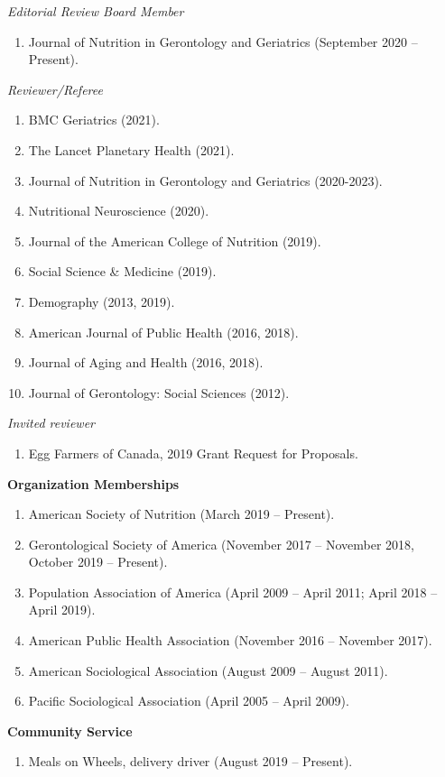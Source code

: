 \documentclass[
]{article}
\providecommand{\tightlist}{%
  \setlength{\itemsep}{0pt}\setlength{\parskip}{0pt}}
\begin{document}
\emph{Editorial Review Board Member}

\begin{enumerate}
\def\labelenumi{\arabic{enumi}.}
\tightlist
\item
  Journal of Nutrition in Gerontology and Geriatrics (September 2020 --
  Present).
\end{enumerate}

\emph{Reviewer/Referee}

\begin{enumerate}
\def\labelenumi{\arabic{enumi}.}
\item
  BMC Geriatrics (2021).
\item
  The Lancet Planetary Health (2021).
\item
  Journal of Nutrition in Gerontology and Geriatrics (2020-2023).
\item
  Nutritional Neuroscience (2020).
\item
  Journal of the American College of Nutrition (2019).
\item
  Social Science \& Medicine (2019).
\item
  Demography (2013, 2019).
\item
  American Journal of Public Health (2016, 2018).
\item
  Journal of Aging and Health (2016, 2018).
\item
  Journal of Gerontology: Social Sciences (2012).
\end{enumerate}

\emph{Invited reviewer}

\begin{enumerate}
\def\labelenumi{\arabic{enumi}.}
\tightlist
\item
  Egg Farmers of Canada, 2019 Grant Request for Proposals.
\end{enumerate}

\textbf{Organization Memberships}

\begin{enumerate}
\def\labelenumi{\arabic{enumi}.}
\item
  American Society of Nutrition (March 2019 -- Present).
\item
  Gerontological Society of America (November 2017 -- November 2018,
  October 2019 -- Present).
\item
  Population Association of America (April 2009 -- April 2011; April
  2018 -- April 2019).
\item
  American Public Health Association (November 2016 -- November 2017).
\item
  American Sociological Association (August 2009 -- August 2011).
\item
  Pacific Sociological Association (April 2005 -- April 2009).
\end{enumerate}

\textbf{Community Service}

\begin{enumerate}
\def\labelenumi{\arabic{enumi}.}
\tightlist
\item
  Meals on Wheels, delivery driver (August 2019 -- Present).
\end{enumerate}
\end{document}
